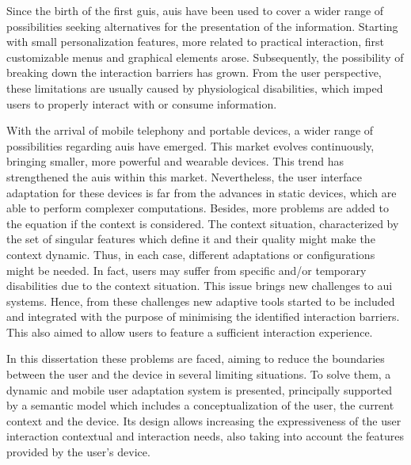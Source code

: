 




\begin{abstracts}        %
Since the birth of the first \acp{gui}, \acp{aui} have been used to cover
a wider range of possibilities seeking alternatives for the presentation of the information. 
Starting with small personalization features, more related to practical interaction, 
first customizable menus and graphical elements arose. Subsequently, the 
possibility of breaking down the interaction barriers has grown. From the user
perspective, these limitations are usually caused by physiological disabilities,
which imped users to properly interact with or consume information. 

With the arrival of mobile telephony and portable devices, a wider range of
possibilities regarding \acp{aui} have emerged. This market evolves continuously, 
bringing smaller, more powerful and wearable devices. This trend has strengthened 
the \acp{aui} within this market. Nevertheless, the user interface adaptation for 
these devices is far from the advances in static devices, which are able to perform 
complexer computations. Besides, more problems are added to the equation if the 
context is considered. The context situation, characterized by the set of singular 
features which define it and their quality might make the context dynamic. Thus, 
in each case, different adaptations or configurations might be needed. In fact, 
users may suffer from specific and/or temporary disabilities due to the context 
situation. This issue brings new challenges to \ac{aui} systems. Hence, from 
these challenges new adaptive tools started to be included and integrated with 
the purpose of minimising the identified interaction barriers. This also aimed 
to allow users to feature a sufficient interaction experience.

In this dissertation these problems are faced, aiming to reduce the boundaries
between the user and the device in several limiting situations. To solve them, 
a dynamic and mobile user adaptation system is presented, principally supported 
by a semantic model which includes a conceptualization of the user, the current
context and the device. Its design allows increasing the expressiveness of the 
user interaction contextual and interaction needs, also taking into account the 
features provided by the user's device.


\end{abstracts}

